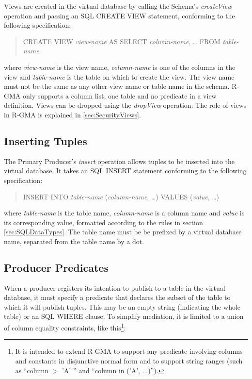 Views are created in the virtual database by calling the Schema's
\textit{createView} operation and passing an SQL CREATE VIEW statement,
conforming to the following specification:

\begin{quote}
CREATE VIEW \textit{view-name} AS SELECT \textit{column-name}, \ldots
FROM \textit{table-name}\end{quote}

where \textit{view-name} is the view name, \textit{column-name}
is one of the columns in the view and \textit{table-name} is the table
on which to create the view. The view name must not be the same as any other
view name or table name in the schema. R-GMA only supports a column list, one
table and no predicate in a view definition.  Views can be dropped
using the \textit{dropView} operation. The role of views in R-GMA is explained
in \ref{sec:SecurityViews}.

\subsection{Inserting Tuples}\label{sec:SQLInsert}

The Primary Producer's \textit{insert} operation allows tuples to be inserted
into the virtual database. It takes an SQL INSERT statement conforming to
the following specification:

\begin{quote}
INSERT INTO \textit{table-name} (\textit{column-name}, \ldots) VALUES
(\textit{value}, \ldots)
\end{quote}

where \textit{table-name} is the table name, \textit{column-name} is a
column name and \textit{value} is its corresponding value, formatted
according to the rules in section \ref{sec:SQLDataTypes}. The table
name must be be prefixed by a virtual database name, separated
from the table name by a dot.

\subsection{Producer Predicates}\label{sec:SQLPredicates}

When a producer registers its intention to publish to a table in the
virtual database, it must specify a predicate that declares the subset
of the table to which it will publish tuples. This may be an empty
string (indicating the whole table) or an SQL WHERE clause. To
simplify mediation, it is limited to a union of column equality
constraints, like this\footnote{It is intended to extend R-GMA to
support any predicate involving columns and constants in disjunctive
normal form and to support string ranges (such as ``column $>$ 'A' ''
and ``column in ('A', ...)'').}:

